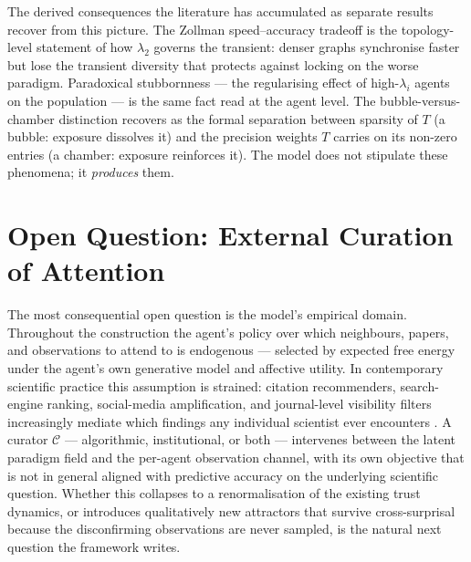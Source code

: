 The derived consequences the literature has accumulated as separate
results recover from this picture. The Zollman speed--accuracy
tradeoff%
is the topology-level statement of how $\lambda_2$ governs the
transient: denser graphs synchronise faster but lose the transient
diversity that protects against locking on the worse paradigm.
Paradoxical stubbornness --- the regularising effect of high-$\lambda_i$
agents on the population --- is the same fact read at the agent
level. The bubble-versus-chamber distinction \citep{Nguyen2018_1}
recovers as the formal separation between sparsity of $T$ (a bubble:
exposure dissolves it) and the precision weights $T$ carries on its
non-zero entries (a chamber: exposure reinforces it). The model does
not stipulate these phenomena; it \emph{produces} them.

\section{Open Question: External Curation of Attention}
\label{sec:discussion}

The most consequential open question is the model's empirical
domain. Throughout the construction the agent's policy over which
neighbours, papers, and observations to attend to is endogenous ---
selected by expected free energy under the agent's own generative
model and affective utility. In contemporary scientific practice
this assumption is strained: citation recommenders, search-engine
ranking, social-media amplification, and journal-level visibility
filters increasingly mediate which findings any individual scientist
ever encounters \citep{kulveit2025GradualDisempowerment,
critchKrueger2020ARCHES}. A curator $\mathcal{C}$ --- algorithmic,
institutional, or both --- intervenes between the latent paradigm
field and the per-agent observation channel, with its own objective
that is not in general aligned with predictive accuracy on the
underlying scientific question. Whether this collapses to a
renormalisation of the existing trust dynamics, or introduces
qualitatively new attractors that survive cross-surprisal because
the disconfirming observations are never sampled, is the natural
next question the framework writes.
